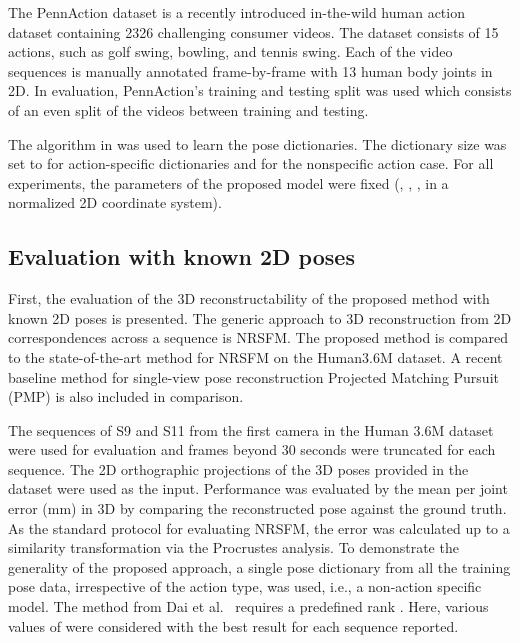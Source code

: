 \documentclass[10pt,twocolumn,letterpaper]{article}
\begin{document}
{The PennAction dataset \cite{zhang2013actemes} is a recently introduced in-the-wild human action dataset
containing 2326 challenging consumer videos.  The dataset consists of
15 actions, such as golf swing, bowling, and tennis swing. Each of the video sequences is manually annotated frame-by-frame with 13 human body joints in 2D.
In evaluation, PennAction's training and testing split was used which consists of an even split of the videos between training and testing.

The algorithm in \cite{zhou2015sparse} was used to learn the pose dictionaries. The dictionary size was set to  for action-specific dictionaries and  for the nonspecific action case.
For all experiments, the parameters of the proposed model were fixed (, , ,  in a normalized 2D coordinate system).

\subsection{Evaluation with known 2D poses} 

First, the evaluation of the 3D reconstructability of the proposed method with known 2D poses is presented. The generic approach to 3D reconstruction from 2D correspondences across a sequence is NRSFM. The proposed method is compared to the state-of-the-art method for NRSFM \cite{dai2012simple} on the Human3.6M dataset. A recent baseline method for single-view pose reconstruction Projected Matching Pursuit (PMP) \cite{ramakrishna2012reconstructing} is also included in comparison.

The sequences of S9 and S11 from the first camera in the Human 3.6M dataset were used for evaluation and frames beyond 30 seconds were truncated for each sequence. The 2D orthographic projections of the 3D poses provided in the dataset were used as the input. Performance was evaluated by the mean per joint error (mm) in 3D by comparing the reconstructed pose against the ground truth. As the standard protocol for evaluating NRSFM, the error was calculated up to a similarity transformation via the Procrustes analysis. To demonstrate the generality of the proposed approach, a single pose dictionary from all the training pose data, irrespective of the action type, was used, i.e., a non-action specific model. The method from Dai et al.\ \cite{dai2012simple} requires a predefined rank .  Here, various
values of  were considered with the best result for each sequence reported.



}
\end{document}
